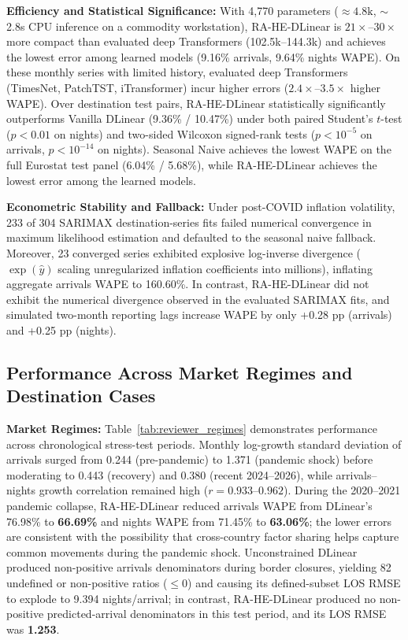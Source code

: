 \documentclass[sigconf]{acmart}
\begin{document}
\textbf{Efficiency and Statistical Significance:} With 4,770 parameters ($\approx 4.8\text{k}$, $\sim$2.8s CPU inference on a commodity workstation), RA-HE-DLinear is $21\times$--$30\times$ more compact than evaluated deep Transformers (102.5k--144.3k) and achieves the lowest error among learned models (9.16\% arrivals, 9.64\% nights WAPE). On these monthly series with limited history, evaluated deep Transformers (TimesNet, PatchTST, iTransformer) incur higher errors ($2.4\times$--$3.5\times$ higher WAPE). Over destination test pairs, RA-HE-DLinear statistically significantly outperforms Vanilla DLinear (9.36\% / 10.47\%) under both paired Student's $t$-test ($p < 0.01$ on nights) and two-sided Wilcoxon signed-rank tests ($p < 10^{-5}$ on arrivals, $p < 10^{-14}$ on nights). Seasonal Naive achieves the lowest WAPE on the full Eurostat test panel (6.04\% / 5.68\%), while RA-HE-DLinear achieves the lowest error among the learned models.

\textbf{Econometric Stability and Fallback:} Under post-COVID inflation volatility, 233 of 304 SARIMAX destination-series fits failed numerical convergence in maximum likelihood estimation and defaulted to the seasonal naive fallback. Moreover, 23 converged series exhibited explosive log-inverse divergence ($\exp(\hat{y})$ scaling unregularized inflation coefficients into millions), inflating aggregate arrivals WAPE to 160.60\%. In contrast, RA-HE-DLinear did not exhibit the numerical divergence observed in the evaluated SARIMAX fits, and simulated two-month reporting lags increase WAPE by only +0.28 pp (arrivals) and +0.25 pp (nights).

\subsection{Performance Across Market Regimes and Destination Cases}

\textbf{Market Regimes:} Table~\ref{tab:reviewer_regimes} demonstrates performance across chronological stress-test periods. Monthly log-growth standard deviation of arrivals surged from 0.244 (pre-pandemic) to 1.371 (pandemic shock) before moderating to 0.443 (recovery) and 0.380 (recent 2024--2026), while arrivals--nights growth correlation remained high ($r=0.933$--$0.962$). During the 2020--2021 pandemic collapse, RA-HE-DLinear reduced arrivals WAPE from DLinear's 76.98\% to \textbf{66.69\%} and nights WAPE from 71.45\% to \textbf{63.06\%}; the lower errors are consistent with the possibility that cross-country factor sharing helps capture common movements during the pandemic shock. Unconstrained DLinear produced non-positive arrivals denominators during border closures, yielding 82 undefined or non-positive ratios ($\le 0$) and causing its defined-subset LOS RMSE to explode to 9.394 nights/arrival; in contrast, RA-HE-DLinear produced no non-positive predicted-arrival denominators in this test period, and its LOS RMSE was \textbf{1.253}.
\end{document}
